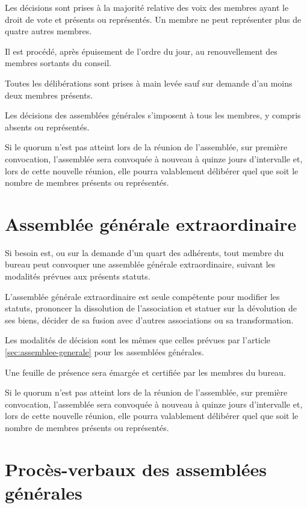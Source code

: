 \documentclass[12 pt]{article}
\begin{document}
Les décisions sont prises à la majorité relative des voix des membres
ayant le droit de vote et présents ou représentés. Un membre ne peut
représenter plus de quatre autres membres.

Il est procédé, après épuisement de l’ordre du jour, au renouvellement
des membres sortants du conseil.

Toutes les délibérations sont prises à main levée sauf sur demande
d’au moins deux membres présents.

Les décisions des assemblées générales s’imposent à tous les membres,
y compris absents ou représentés.

Si le quorum n'est pas atteint lors de la réunion de l'assemblée, sur
première convocation, l'assemblée sera convoquée à nouveau à quinze
jours d'intervalle et, lors de cette nouvelle réunion, elle pourra
valablement délibérer quel que soit le nombre de membres présents ou
représentés.


\section{Assemblée générale extraordinaire}
\label{sec:assemblee-generale-extraordinaire}

Si besoin est, ou sur la demande d’un quart des adhérents, tout membre
du bureau peut convoquer une assemblée générale extraordinaire,
suivant les modalités prévues aux présents statuts.

L'assemblée générale extraordinaire est seule compétente pour modifier
les statuts, prononcer la dissolution de l'association et statuer sur
la dévolution de ses biens, décider de sa fusion avec d'autres
associations ou sa transformation.

Les modalités de décision sont les mêmes que celles prévues par
l'article \ref{sec:assemblee-generale} pour les assemblées générales.

Une feuille de présence sera émargée et certifiée par les membres du bureau.

Si le quorum n'est pas atteint lors de la réunion de l'assemblée, sur
première convocation, l'assemblée sera convoquée à nouveau à quinze
jours d'intervalle et, lors de cette nouvelle réunion, elle pourra
valablement délibérer quel que soit le nombre de membres présents ou
représentés.

\section{Procès-verbaux des assemblées générales}
\label{sec:proces-verbaux-des-assemblees-generales}
\end{document}

